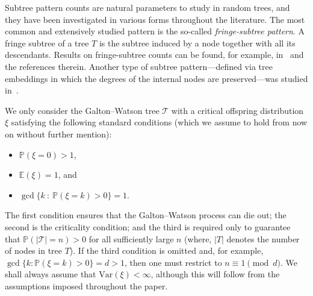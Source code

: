 \documentclass[article]{amsart}
\newcommand{\Var} {\mathrm {Var}}
\newcommand{\tc}{\mathcal{T}}
\newcommand{\E}{\mathbb{E}}
\theoremstyle{definition}
\theoremstyle{remark}
\begin{document}
Subtree pattern counts are natural parameters to study in random trees, and they have been investigated in various forms throughout the literature. The most common and extensively studied pattern is the so-called \emph{fringe-subtree pattern}. A fringe subtree of a tree $T$ is the subtree induced by a node together with all its descendants. Results on fringe-subtree counts can be found, for example, in~\cite{MR1102319,J16} and the references therein. Another type of subtree pattern—defined via tree embeddings in which the degrees of the internal nodes are preserved—was studied in~\cite{CHYZAK_DRMOTA_KLAUSNER_KOK_2008}.
   
We only consider the Galton–Watson tree $\tc$ with a critical offspring distribution $\xi$ satisfying the following standard conditions (which we assume to hold from now on without further mention):
\begin{itemize}
    \item $\mathbb{P}(\xi=0)>1$, 
    \item $\E(\xi)=1$, and 
    \item $\gcd\{k \ :\ \mathbb{P}(\xi=k)>0\}=1$.
\end{itemize}
The first condition ensures that the Galton--Watson process can die out; the second is the criticality condition; and the third is required only to guarantee that $\mathbb{P}(|\tc| = n) > 0$ for all sufficiently large $n$ (where, $|T|$ denotes the number of nodes in tree $T$). If the third condition is omitted and, for example, $\gcd\{k : \mathbb{P}(\xi = k) > 0\} = d > 1$, then one must restrict to $n \equiv 1 \pmod d$. We shall always assume that $\Var(\xi)<\infty$, although this will follow from the assumptions imposed throughout the paper.
\end{document}

